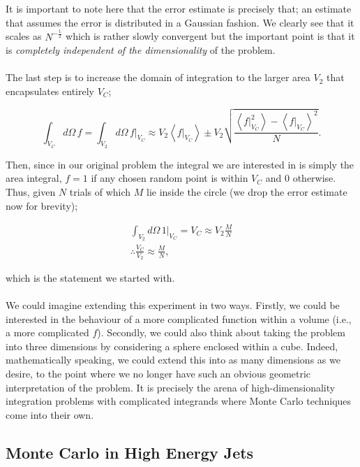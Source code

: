 It is important to note here that the error estimate is precisely that; an estimate that assumes the error is distributed in a Gaussian fashion. We clearly see that it scales as $N^{-\frac{1}{2}}$ which is rather slowly convergent but the important point is that it is \emph{completely independent of the dimensionality} of the problem.  \\
\\
The last step is to increase the domain of integration to the larger area $V_2$ that encapsulates entirely $V_C$;

\begin{equation}
\int_{V_C} d \Omega \hspace{2pt} f  = \int_{V_2} d \Omega \hspace{2pt} f|_{V_C} \approx V_2 \left< f|_{V_C}  \right> \pm V_2 \sqrt{\frac{\left< f|_{V_C} ^2 \right> - \left< f|_{V_C}  \right>^2}{N}}.
\end{equation}

Then, since in our original problem the integral we are interested in is simply the area integral, $f = 1$ if any chosen random point is within $V_C$ and $0$ otherwise. Thus, given $N$ trials of which $M$ lie inside the circle (we drop the error estimate now for brevity);

\begin{equation}
\begin{split}
\int_{V_2} d \Omega \hspace{2pt} 1|_{V_C} = V_C \approx V_2 \frac{M}{N} \\
\therefore \frac{V_C}{V_2} \approx \frac{M}{N},
\end{split}
\end{equation}

which is the statement we started with. \\
\\
We could imagine extending this experiment in two ways. Firstly, we could be interested in the behaviour of a more complicated function within a volume (i.e., a more complicated $f$). Secondly, we could also think about taking the problem into three dimensions by considering a sphere enclosed within a cube. Indeed, mathematically speaking, we could extend this into as many dimensions as we desire, to the point where we no longer have such an obvious geometric interpretation of the problem. It is precisely the arena of high-dimensionality integration problems with complicated integrands where Monte Carlo techniques come into their own.

\subsection{Monte Carlo in High Energy Jets}

